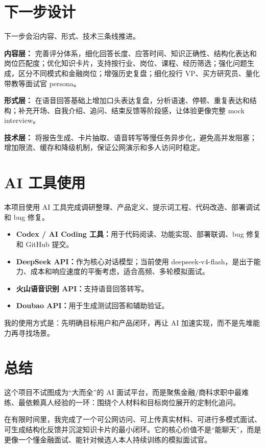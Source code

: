 \documentclass[10pt,a4paper]{ctexart}
\begin{document}
\section{下一步设计}

下一步会沿内容、形式、技术三条线推进。

\textbf{内容层：} 完善评分体系，细化回答长度、应答时间、知识正确性、结构化表达和岗位匹配度；优化知识卡片，支持按行业、岗位、课程、经历筛选；强化问题生成，区分不同模式和金融岗位；增强历史复盘；细化投行 VP、买方研究员、量化带教等面试官 persona。

\textbf{形式层：} 在语音回答基础上增加口头表达复盘，分析语速、停顿、重复表达和结构；补充开场、自我介绍、追问、结束反馈等阶段感，让体验更像完整 mock interview。

\textbf{技术层：} 将报告生成、卡片抽取、语音转写等慢任务异步化，避免高并发阻塞；增加限流、缓存和降级机制，保证公网演示和多人访问时稳定。

\section{AI 工具使用}

本项目使用 AI 工具完成调研整理、产品定义、提示词工程、代码改造、部署调试和 bug 修复。

\begin{itemize}
  \item \textbf{Codex / AI Coding 工具：}用于代码阅读、功能实现、部署联调、bug 修复和 GitHub 提交。
  \item \textbf{DeepSeek API：}作为核心对话模型；当前使用 deepseek-v4-flash，是出于能力、成本和响应速度的平衡考虑，适合高频、多轮模拟面试。
  \item \textbf{火山语音识别 API：}支持语音回答转写。
  \item \textbf{Doubao API：}用于生成测试回答和辅助验证。
\end{itemize}

我的使用方式是：先明确目标用户和产品闭环，再让 AI 加速实现，而不是先堆能力再寻找场景。

\section{总结}

这个项目不试图成为“大而全”的 AI 面试平台，而是聚焦金融/商科求职中最难练、最依赖真人经验的一环：围绕个人材料和目标岗位展开的定制化追问。

在有限时间里，我完成了一个可公网访问、可上传真实材料、可进行多模式面试、可生成结构化反馈并沉淀知识卡片的最小闭环。它的核心价值不是“能聊天”，而是更像一个懂金融面试、能针对候选人本人持续训练的模拟面试官。
\end{document}
